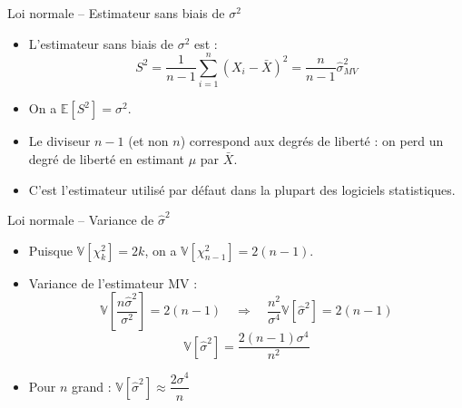 \documentclass[11pt,aspectratio=169]{beamer}
\begin{document}
\begin{frame}{Loi normale -- Estimateur sans biais de $\sigma^2$}

\begin{itemize}

\item L'estimateur sans biais de $\sigma^2$ est :
  \[
  \boxed{S^2 = \frac{1}{n-1}\sum_{i=1}^n (X_i - \bar{X})^2 = \frac{n}{n-1}\hat{\sigma}^2_{MV}}
  \]

\item On a $\mathbb{E}[S^2] = \sigma^2$.\newline

\item Le diviseur $n-1$ (et non $n$) correspond aux degrés de liberté : on perd un degré de liberté en estimant $\mu$ par $\bar{X}$.\newline

\item C'est l'estimateur utilisé par défaut dans la plupart des logiciels statistiques.

\end{itemize}

\end{frame}

\begin{frame}{Loi normale -- Variance de $\hat{\sigma}^2$}

\begin{itemize}

\item Puisque $\mathbb{V}[\chi^2_k] = 2k$, on a $\mathbb{V}[\chi^2_{n-1}] = 2(n-1)$.\newline

\item Variance de l'estimateur MV :
  \[
  \mathbb{V}\left[\frac{n\hat{\sigma}^2}{\sigma^2}\right] = 2(n-1) \quad \Rightarrow \quad \frac{n^2}{\sigma^4}\mathbb{V}[\hat{\sigma}^2] = 2(n-1)
  \]
  \[
  \boxed{\mathbb{V}[\hat{\sigma}^2] = \frac{2(n-1)\sigma^4}{n^2}}
  \]

\item Pour $n$ grand : $\mathbb{V}[\hat{\sigma}^2] \approx \dfrac{2\sigma^4}{n}$

\end{itemize}

\end{frame}
\end{document}
